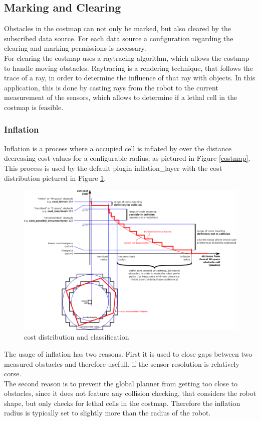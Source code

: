 \subsection{Marking and Clearing}
Obstacles in the costmap can not only be marked, but also cleared by the subscribed data source. For each data source a configuration regarding the clearing and marking permissions is necessary.\\
For clearing the costmap uses a raytracing algorithm, which allows the costmap to handle moving obstacles\cite{costmap}. Raytracing is a rendering technique, that follows the trace of a ray, in order to determine the influence of that ray with objects. 
In this application, this is done by casting rays from the robot to the current measurement of the sensors, which allows to determine if a lethal cell in the costmap is feasible.
\subsubsection{Inflation}
Inflation is a process where a occupied cell is inflated by over the distance decreasing cost values for a configurable radius, as pictured in Figure \ref{costmap}.\\
This process is used by the default plugin inflation\_layer with the cost distribution pictured in Figure \ref{costdistribution}\cite{costmap}.

\begin{figure}[H]
	\centering
	\includegraphics[width=\linewidth]{Pictures/costmapinflation}
	\caption{cost distribution and classification \cite{costmap}}
	\label{costdistribution}
\end{figure}

The usage of inflation has two reasons. First it is used to close gaps between two measured obstacles and therefore usefull, if the sensor resolution is relatively corse.\\
The second reason is to prevent the global planner from getting too close to obstacles, since it does not feature any collision checking, that considers the robot shape, but only checks for lethal cells in the costmap. Therefore the inflation radius is typically set to slightly more than the radius of the robot\cite{costmap}.

